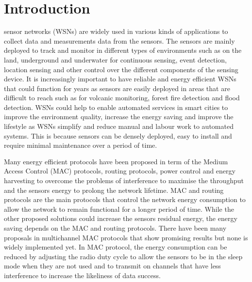 \section{Introduction}

% 
% 
% 
% 

 sensor networks (WSNs) are widely used in various kinds of applications to collect data and measurements data from the sensors. The sensors are mainly deployed to track and monitor in different types of environments such as on the land, underground and underwater for continuous sensing, event detection, location sensing and other control over the different components of the sensing device. It is increasingly important to have reliable and energy efficient WSNs that could function for years as sensors are easily deployed in areas that are difficult to reach such as for volcanic monitoring, forest fire detection and flood detection. WSNs could help to enable automated services in smart cities to improve the environment quality, increase the energy saving and improve the lifestyle as WSNs simplify and reduce manual and labour work to automated systems. This is because sensors can be densely deployed, easy to install and require minimal maintenance over a period of time. 

Many energy efficient protocols have been proposed in term of the Medium Access Control (MAC) protocols, routing protocols, power control and energy harvesting to overcome the problems of interference to maximise the throughput and the sensors energy to prolong the network lifetime. 
MAC and routing protocols are the main protocols that control the network energy consumption to allow the network to remain functional for a longer period of time. While the other proposed solutions could increase the sensors residual energy, the energy saving depends on the MAC and routing protocols.
There have been many proposals in multichannel MAC protocols that show promising results but none is widely implemented yet. In MAC protocol, the energy consumption can be reduced by adjusting the radio duty cycle to allow the sensors to be in the sleep mode when they are not used and to transmit on channels that have less interference to increase the likeliness of data success.

